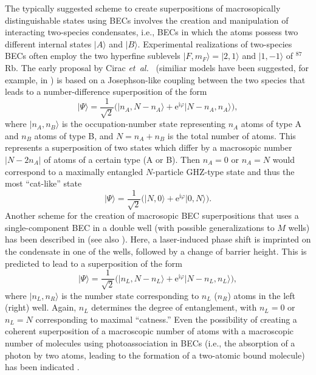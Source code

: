 \documentclass[12pt,aps,floatfix,amsmath,amssymb,showpacs,nofootinbib]{revtex4-2}
\newcommand{\be}{\begin{equation}} \newcommand{\ee}{\end{equation}}
\newcommand{\etal}{\emph{et~al.\ }}
\newcommand{\ket}[1]{\ensuremath{|{#1\rangle}}}
\newcommand{\e}{\ensuremath{\mathrm{e}}}
\begin{document}
The typically suggested scheme to create superpositions of
macrosopically distinguishable states using BECs involves the creation
and manipulation of interacting two-species condensates, i.e., BECs in
which the atoms possess two different internal states $\ket{A}$ and
$\ket{B}$. Experimental realizations of two-species BECs often employ
the two hyperfine sublevels $\ket{F,m_F} = \ket{2,1}$ and $\ket{1,-1}$
of $^{87}$Rb. The early proposal by Cirac \etal \cite{Cirac:1998:mm}
(similiar models have been suggested, for
example, in \cite{Ruostekoski:1998:mm,Gordon:1999:mh,%
  Dunningham:2001:da,Micheli:2003:jn,Jack:2005:oo}) is based on a Josephson-like
coupling between the two species that leads to a number-difference
superposition of the form
%
\be \label{eq:bec-cat1}
\ket{\Psi} = \frac{1}{\sqrt{2}} \bigl( \ket{n_A,N-n_A} + \e^{\mathrm{i}\varphi}
\ket{N-n_A,n_A} \bigr),
\ee 
%
where $\ket{n_A, n_B}$ is the occupation-number state representing
$n_A$ atoms of type A and $n_B$ atoms of type B, and $N=n_A+n_B$ is
the total number of atoms. This represents a superposition of two
states which differ by a macrosopic number $|N-2n_A|$ of atoms of a
certain type (A or B). Then $n_A=0$ or $n_A=N$ would correspond to a
maximally entangled $N$-particle GHZ-type state
\cite{Greenberger:1990:bw} and thus the most ``cat-like'' state
%
\be \label{eq:bec-cat2}
\ket{\Psi} = \frac{1}{\sqrt{2}} \bigl( \ket{N,0} + \e^{\mathrm{i}\varphi}
\ket{0,N} \bigr).
\ee 
%
Another scheme for the creation of macrosopic BEC superpositions that
uses a single-component BEC in a double well (with possible
generalizations to $M$ wells) has been described in
\cite{Mahmud:2004:rz,Mahmud:2005:rz} (see also
\cite{Polkovnikov:2002:ii,Polkovnikov:2003:ll}).  Here, a
laser-induced phase shift is imprinted on the condensate in one of the
wells, followed by a change of barrier height. This is predicted to
lead to a superposition of the form
%
\be\label{eq:bec-cat3}
\ket{\Psi} = \frac{1}{\sqrt{2}} \bigl( \ket{n_L,N-n_L} + \e^{\mathrm{i}\varphi}
\ket{N-n_L,n_L} \bigr), 
\ee
%
where $\ket{n_L,n_R}$ is the number state corresponding to $n_L$
($n_R$) atoms in the left (right) well. Again, $n_L$ determines the
degree of entanglement, with $n_L=0$ or $n_L=N$ corresponding to
maximal ``catness.''  Even the possibility of creating a coherent
superposition of a macroscopic number of atoms with a macroscopic
number of molecules using photoassociation in BECs (i.e., the
absorption of a photon by two atoms, leading to the formation of a
two-atomic bound molecule) has been indicated
\cite{Calsamiglia:2001:tt}.
\end{document}
